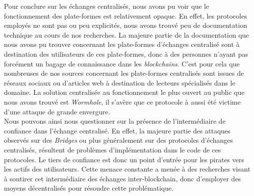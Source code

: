 Pour conclure sur les échanges centralisés, nous avons pu voir que le fonctionnement des plate-formes est relativement opaque. 
En effet, les protocoles employés ne sont pas ou peu explicités, nous avons trouvé peu de documentation technique au cours de nos recherches. 
La majeure partie de la documentation que nous avons pu trouver concernant les plate-formes d'échanges centralisé sont à destination des utilisateurs de ces plate-formes, donc à des personnes n'ayant pas forcément un bagage de connaissance dans les \textit{\gls{blockchain}s}. 
C'est pour cela que nombreuses de nos sources concernant les plate-formes centralisés sont issues de réseaux sociaux ou d'articles web à destination de lecteurs spécialisés dans le domaine. 
La solution centralisée au fonctionnement le plus ouvert au public que nous avons trouvé est \textit{Wormhole}, il s'avère que ce protocole à aussi été victime d'une attaque de grande envergure. \\
Nous pouvons ainsi nous questionner sur la présence de l'intermédiaire de confiance dans l'échange centralisé. 
En effet, la majeure partie des attaques observés sur des \textit{Bridges} ou plus généralement sur des protocoles d'échanges centralisés, résultent de problèmes d'implémentation dans le code de ces protocoles. 
Le tiers de confiance est donc un point d'entrée pour les pirates vers les \gls{actif}s des utilisateurs. 
Cette menace constante a menée à des recherches visant à soutirer cet intermédiaire des échanges inter-\gls{blockchain}, donc d'employer des moyens décentralisés pour résoudre cette problématique. 